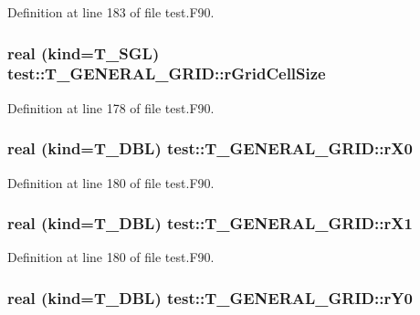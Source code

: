 Definition at line 183 of file test.F90.

\hypertarget{typetest_1_1_t___g_e_n_e_r_a_l___g_r_i_d_ad71744edf8415af44ccc4bab330dbe5f}{
\subsubsection[{rGridCellSize}]{\setlength{\rightskip}{0pt plus 5cm}real (kind={\bf T\_\-SGL}) {\bf test::T\_\-GENERAL\_\-GRID::rGridCellSize}}}
\label{typetest_1_1_t___g_e_n_e_r_a_l___g_r_i_d_ad71744edf8415af44ccc4bab330dbe5f}


Definition at line 178 of file test.F90.

\hypertarget{typetest_1_1_t___g_e_n_e_r_a_l___g_r_i_d_ad0f63157f6f9ff937515f079f2c1af10}{
\subsubsection[{rX0}]{\setlength{\rightskip}{0pt plus 5cm}real (kind={\bf T\_\-DBL}) {\bf test::T\_\-GENERAL\_\-GRID::rX0}}}
\label{typetest_1_1_t___g_e_n_e_r_a_l___g_r_i_d_ad0f63157f6f9ff937515f079f2c1af10}


Definition at line 180 of file test.F90.

\hypertarget{typetest_1_1_t___g_e_n_e_r_a_l___g_r_i_d_a9483a92d88950ac9ae3fa5717118963a}{
\subsubsection[{rX1}]{\setlength{\rightskip}{0pt plus 5cm}real (kind={\bf T\_\-DBL}) {\bf test::T\_\-GENERAL\_\-GRID::rX1}}}
\label{typetest_1_1_t___g_e_n_e_r_a_l___g_r_i_d_a9483a92d88950ac9ae3fa5717118963a}


Definition at line 180 of file test.F90.

\hypertarget{typetest_1_1_t___g_e_n_e_r_a_l___g_r_i_d_a35cb6a9594cace7980976521c4be9ae7}{
\subsubsection[{rY0}]{\setlength{\rightskip}{0pt plus 5cm}real (kind={\bf T\_\-DBL}) {\bf test::T\_\-GENERAL\_\-GRID::rY0}}}
\label{typetest_1_1_t___g_e_n_e_r_a_l___g_r_i_d_a35cb6a9594cace7980976521c4be9ae7}


